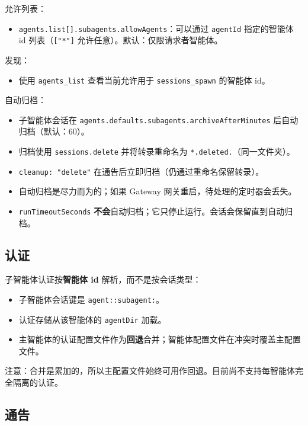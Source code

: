 允许列表：

\begin{itemize}
  \item \texttt{agents.list[].subagents.allowAgents}：可以通过 \texttt{agentId} 指定的智能体 id 列表（\texttt{["*"]} 允许任意）。默认：仅限请求者智能体。
\end{itemize}


发现：

\begin{itemize}
  \item 使用 \texttt{agents\_list} 查看当前允许用于 \texttt{sessions\_spawn} 的智能体 id。
\end{itemize}


自动归档：

\begin{itemize}
  \item 子智能体会话在 \texttt{agents.defaults.subagents.archiveAfterMinutes} 后自动归档（默认：60）。
  \item 归档使用 \texttt{sessions.delete} 并将转录重命名为 \texttt{*.deleted.}（同一文件夹）。
  \item \texttt{cleanup: "delete"} 在通告后立即归档（仍通过重命名保留转录）。
  \item 自动归档是尽力而为的；如果 Gateway 网关重启，待处理的定时器会丢失。
  \item \texttt{runTimeoutSeconds} \textbf{不会}自动归档；它只停止运行。会话会保留直到自动归档。
\end{itemize}


\subsection{认证}


子智能体认证按\textbf{智能体 id} 解析，而不是按会话类型：

\begin{itemize}
  \item 子智能体会话键是 \texttt{agent::subagent:}。
  \item 认证存储从该智能体的 \texttt{agentDir} 加载。
  \item 主智能体的认证配置文件作为\textbf{回退}合并；智能体配置文件在冲突时覆盖主配置文件。
\end{itemize}


注意：合并是累加的，所以主配置文件始终可用作回退。目前尚不支持每智能体完全隔离的认证。

\subsection{通告}


